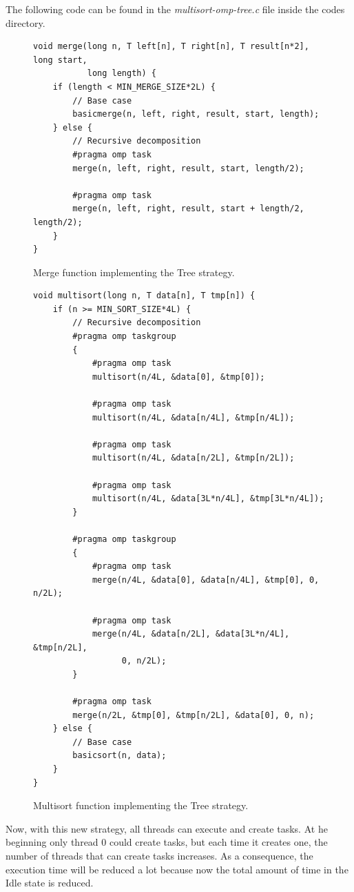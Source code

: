 \documentclass[12pt, a4paper]{article}
\begin{document}
The following code can be found in the \textit{multisort-omp-tree.c} file inside the codes directory.

\begin{figure}[H]
\begin{lstlisting}
void merge(long n, T left[n], T right[n], T result[n*2], long start,
	 	   long length) {
    if (length < MIN_MERGE_SIZE*2L) {
        // Base case
        basicmerge(n, left, right, result, start, length);
    } else {
        // Recursive decomposition
        #pragma omp task
        merge(n, left, right, result, start, length/2);
        
        #pragma omp task
        merge(n, left, right, result, start + length/2, length/2);
    }
}
\end{lstlisting}

\caption{Merge function implementing the Tree strategy.}
\end{figure}

\begin{figure}[H]
\begin{lstlisting}
void multisort(long n, T data[n], T tmp[n]) {
    if (n >= MIN_SORT_SIZE*4L) {
	    // Recursive decomposition
	    #pragma omp taskgroup
	    {
			#pragma omp task
			multisort(n/4L, &data[0], &tmp[0]);
			
			#pragma omp task
			multisort(n/4L, &data[n/4L], &tmp[n/4L]);
			
			#pragma omp task
			multisort(n/4L, &data[n/2L], &tmp[n/2L]);
			
			#pragma omp task
			multisort(n/4L, &data[3L*n/4L], &tmp[3L*n/4L]);
		}
	
		#pragma omp taskgroup
		{
			#pragma omp task
			merge(n/4L, &data[0], &data[n/4L], &tmp[0], 0, n/2L);
			
			#pragma omp task
			merge(n/4L, &data[n/2L], &data[3L*n/4L], &tmp[n/2L],
				  0, n/2L);
		}
		
		#pragma omp task
	    merge(n/2L, &tmp[0], &tmp[n/2L], &data[0], 0, n);
	} else {
		// Base case
		basicsort(n, data);
	}
}
\end{lstlisting}

\caption{Multisort function implementing the Tree strategy.}
\end{figure}

Now, with this new strategy, all threads can execute and create tasks. At he beginning only thread 0 could create tasks, but each time it creates one, the number of threads that can create tasks increases. As a consequence, the execution time will be reduced a lot because now the total amount of time in the Idle state is reduced.
\end{document}
